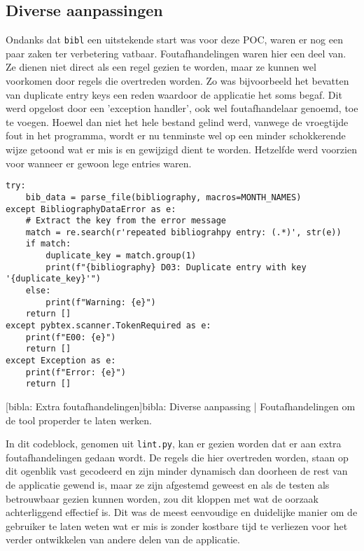 
\subsection{Diverse aanpassingen}
Ondanks dat \texttt{bibl} een uitstekende start was voor deze \acrlong{POC}, waren er nog een paar zaken ter verbetering vatbaar. Foutafhandelingen waren hier een deel van. Ze dienen niet direct als een regel gezien te worden, maar ze kunnen wel voorkomen door regels die overtreden worden. Zo was bijvoorbeeld het bevatten van duplicate entry keys een reden waardoor de applicatie het soms begaf. Dit werd opgelost door een 'exception handler', ook wel foutafhandelaar genoemd, toe te voegen. Hoewel dan niet het hele bestand gelind werd, vanwege de vroegtijde fout in het programma, wordt er nu tenminste wel op een minder schokkerende wijze getoond wat er mis is en gewijzigd dient te worden. Hetzelfde werd voorzien voor wanneer er gewoon lege entries waren.  

\begin{verbatim}
try:
    bib_data = parse_file(bibliography, macros=MONTH_NAMES)
except BibliographyDataError as e:
    # Extract the key from the error message
    match = re.search(r'repeated bibliograhpy entry: (.*)', str(e))
    if match:
        duplicate_key = match.group(1)
        print(f"{bibliography} D03: Duplicate entry with key '{duplicate_key}'")
    else:
        print(f"Warning: {e}")
    return []
except pybtex.scanner.TokenRequired as e:
    print(f"E00: {e}")
    return []
except Exception as e:
    print(f"Error: {e}")
    return []
\end{verbatim}
[bibla: Extra foutafhandelingen]{bibla: Diverse aanpassing | Foutafhandelingen om de tool properder te laten werken. \label{lst:bibla_foutafhandelingen_voorbeeld}}

In dit codeblock, genomen uit \texttt{lint.py}, kan er gezien worden dat er aan extra foutafhandelingen gedaan wordt. De regels die hier overtreden worden, staan op dit ogenblik vast gecodeerd en zijn minder dynamisch dan doorheen de rest van de applicatie gewend is, maar ze zijn afgestemd geweest en als de testen als betrouwbaar gezien kunnen worden, zou dit kloppen met wat de oorzaak achterliggend effectief is. Dit was de meest eenvoudige en duidelijke manier om de gebruiker te laten weten wat er mis is zonder kostbare tijd te verliezen voor het verder ontwikkelen van andere delen van de applicatie.

